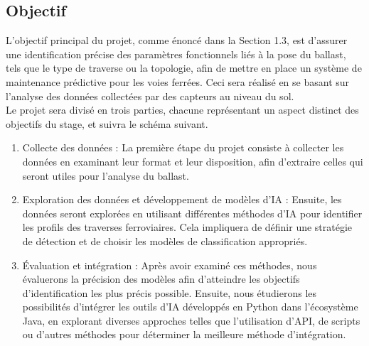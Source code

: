


\subsection{Objectif}
L'objectif principal du projet, comme énoncé dans la Section 1.3, est d'assurer une identification précise des paramètres fonctionnels liés à la pose du ballast, tels que le type de traverse ou la topologie, afin de mettre en place un système de maintenance prédictive pour les voies ferrées. Ceci sera réalisé en se basant sur l'analyse des données collectées par des capteurs au niveau du sol. \\

Le projet sera divisé en trois parties, chacune représentant un aspect distinct des objectifs du stage, et suivra le schéma suivant.
\begin{enumerate}
    \item Collecte des données : La première étape du projet consiste à collecter les données en examinant leur format et leur disposition, afin d'extraire celles qui seront utiles pour l'analyse du ballast.

    \item Exploration des données et développement de modèles d'IA : Ensuite, les données seront explorées en utilisant différentes méthodes d'IA pour identifier les profils des traverses ferroviaires. Cela impliquera de définir une stratégie de détection et de choisir les modèles de classification appropriés.
\newpage
    \item Évaluation et intégration : Après avoir examiné ces méthodes, nous évaluerons la précision des modèles afin d'atteindre les objectifs d'identification les plus précis possible. Ensuite, nous étudierons les possibilités d'intégrer les outils d'IA développés en Python dans l'écosystème Java, en explorant diverses approches telles que l'utilisation d'API, de scripts ou d'autres méthodes pour déterminer la meilleure méthode d'intégration.
\end{enumerate}



